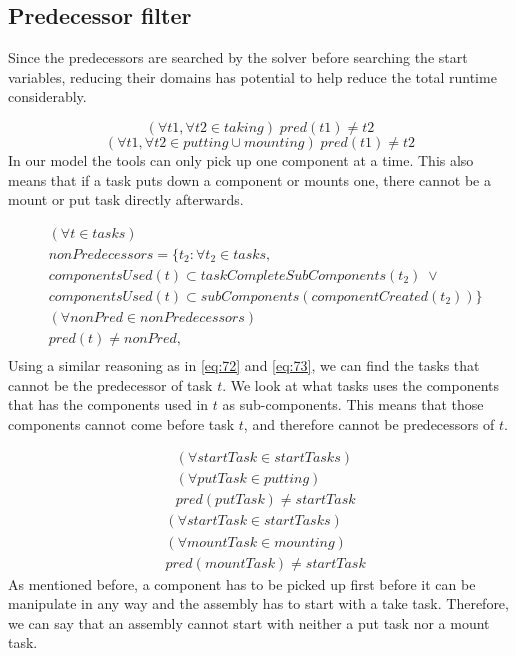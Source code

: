   
  \subsection{Predecessor filter}
  Since the predecessors are searched by the solver before searching the start variables, reducing their domains has potential to help reduce the total runtime considerably.
 
  \begin{equation}\label{eq:75}
  (\forall t1, \forall t2 \in taking) \; pred(t1) \neq t2
  \end{equation}
  \begin{equation}\label{eq:76}
  (\forall t1, \forall t2 \in putting \cup mounting) \; pred(t1) \neq t2
  \end{equation}
 In our model the tools can only pick up one component at a time. This also means that if a task puts down a component or mounts one, there cannot be a mount or put task directly afterwards.
  
  \begin{equation}
  \begin{aligned}\label{eq:78}
  &(\forall t \in tasks)\\
  &nonPredecessors = \{t_2 : \forall t_2 \in tasks, \\
  &componentsUsed(t) \subset taskCompleteSubComponents(t_2) \; \lor \\
  &componentsUsed(t) \subset subComponents(componentCreated(t_2))\} \\
  &(\forall nonPred \in nonPredecessors) \\
  &pred(t) \neq nonPred, \\
  \end{aligned}
  \end{equation}
  Using a similar reasoning as in \ref{eq:72} and \ref{eq:73}, we can find the tasks that cannot be the predecessor of task $t$. We look at what tasks uses the components that has the components used in $t$ as sub-components. This means that those components cannot come before task $t$, and therefore cannot be predecessors of $t$.
  
  \begin{equation}\label{eq:79}
  \begin{aligned}
  &(\forall startTask \in startTasks)\\
  &(\forall putTask \in putting)\\
  &pred(putTask) \neq startTask
  \end{aligned}
  \end{equation}
  \begin{equation}\label{eq:80}
   \begin{aligned}
   &(\forall startTask \in startTasks)\\
   &(\forall mountTask \in mounting)\\
   &pred(mountTask) \neq startTask 
   \end{aligned}
  \end{equation}
  As mentioned before, a component has to be picked up first before it can be manipulate in any way and the assembly has to start with a take task. Therefore, we can say that an assembly cannot start with neither a put task nor a mount task.
  
